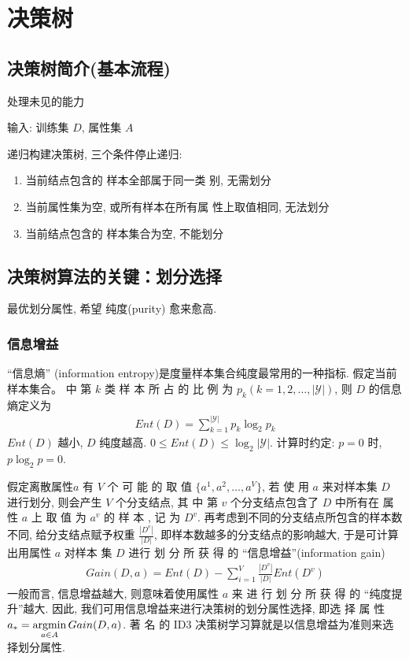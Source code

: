 \newpage
\section{决策树}
\subsection{决策树简介(基本流程)}
处理未见的能力

输入: 训练集 $D$, 属性集 $A$ 

递归构建决策树, 三个条件停止递归:
\begin{enumerate}
    \item 当前结点包含的
    样本全部属于同一类
    别, 无需划分
    \item 当前属性集为空, 
    或所有样本在所有属
    性上取值相同, 无法划分
    \item 当前结点包含的
    样本集合为空, 不能划分
\end{enumerate}

\subsection{决策树算法的关键：划分选择}
最优划分属性, 希望 纯度(purity) 愈来愈高. 

\subsubsection{信息增益}
``信息熵'' (information entropy)是度量样本集合纯度最常用的一种指标.
假定当前样本集合。 中 第 $k$ 类 样 本 所 占 的 比 例 为 $p_k(k=1,2,\dots,|\mathcal{Y}|)$, 则 $D$ 的信息熵定义为
\begin{align*}
    Ent(D)=\sum_{k=1}^{|\mathcal{Y}|}p_k\log_2 p_k
\end{align*}
$Ent(D)$ 越小, $D$ 纯度越高. $0\le Ent(D)\le \log_2|\mathcal{Y}|$. 计算时约定: $p=0$ 时, $p\log_2 p=0$. 

假定离散属性$a$ 有 $V$ 个 可 能 的 取 值 $\{ a^1, a^2,\dots,a^V \}$, 若 使 用 $a$ 来对样本集 $D$ 进行划分, 则会产生 $V$ 个分支结点, 其 中 第 $v$ 个分支结点包含了 $D$ 中所有在 属 性 $a$ 上 取 值 为 $a^v$ 的 样 本 , 记 为 $D^v$. 再考虑到不同的分支结点所包含的样本数不同, 给分支结点赋予权重 $\frac{|D^v|}{|D|}$, 即样本数越多的分支结点的影响越大, 于是可计算出用属性 $a$ 对样本 集 $D$ 进行 划 分 所 获 得 的 ``信息增益''(information gain)
\begin{align*}
    Gain(D, a)=Ent(D)-\sum_{i=1}^V \frac{|D^v|}{|D|}Ent(D^v)
\end{align*}
一般而言, 信息增益越大, 则意味着使用属性 $a$ 来 进 行 划 分 所 获 得 的 ``纯度提升''越大. 因此, 我们可用信息增益来进行决策树的划分属性选择, 即选 择 属 性 $\displaystyle a_*=\operatorname*{argmin}_{a\in A}Gain(D,a)$. 著 名 的 ID3 决策树学习算就是以信息增益为准则来选择划分属性.

